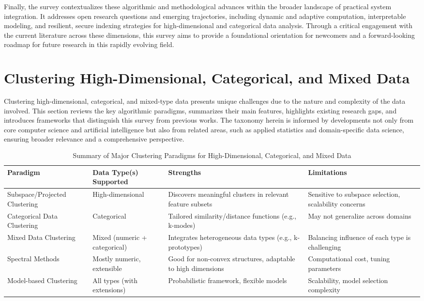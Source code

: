 \documentclass[sigconf]{acmart}
\begin{document}
Finally, the survey contextualizes these algorithmic and methodological advances within the broader landscape of practical system integration. It addresses open research questions and emerging trajectories, including dynamic and adaptive computation, interpretable modeling, and resilient, secure indexing strategies for high-dimensional and categorical data analysis. Through a critical engagement with the current literature across these dimensions, this survey aims to provide a foundational orientation for newcomers and a forward-looking roadmap for future research in this rapidly evolving field.

\section{Clustering High-Dimensional, Categorical, and Mixed Data}

Clustering high-dimensional, categorical, and mixed-type data presents unique challenges due to the nature and complexity of the data involved. This section reviews the key algorithmic paradigms, summarizes their main features, highlights existing research gaps, and introduces frameworks that distinguish this survey from previous works. The taxonomy herein is informed by developments not only from core computer science and artificial intelligence but also from related areas, such as applied statistics and domain-specific data science, ensuring broader relevance and a comprehensive perspective.

\begin{table*}[htbp]
\centering
\caption{Summary of Major Clustering Paradigms for High-Dimensional, Categorical, and Mixed Data}
\label{tab:clustering-paradigms}
\begin{adjustbox}{max width=\textwidth}
\begin{tabular}{@{}llll@{}}
\toprule
Paradigm & Data Type(s) Supported & Strengths & Limitations \\
\midrule
Subspace/Projected Clustering & High-dimensional & Discovers meaningful clusters in relevant feature subsets & Sensitive to subspace selection, scalability concerns \\
Categorical Data Clustering & Categorical & Tailored similarity/distance functions (e.g., k-modes) & May not generalize across domains \\
Mixed Data Clustering & Mixed (numeric + categorical) & Integrates heterogeneous data types (e.g., k-prototypes) & Balancing influence of each type is challenging \\
Spectral Methods & Mostly numeric, extensible & Good for non-convex structures, adaptable to high dimensions & Computational cost, tuning parameters \\
Model-based Clustering & All types (with extensions) & Probabilistic framework, flexible models & Scalability, model selection complexity \\
\bottomrule
\end{tabular}
\end{adjustbox}
\end{table*}
\end{document}
